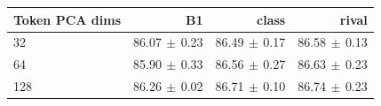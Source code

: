 \begin{tabular}{lrrr}
\toprule
Token PCA dims & B1 & class & rival \\
\midrule
32 & 86.07{\scriptsize$\,\pm\,$0.23} & 86.49{\scriptsize$\,\pm\,$0.17} & 86.58{\scriptsize$\,\pm\,$0.13} \\
64 & 85.90{\scriptsize$\,\pm\,$0.33} & 86.56{\scriptsize$\,\pm\,$0.27} & 86.63{\scriptsize$\,\pm\,$0.23} \\
128 & 86.26{\scriptsize$\,\pm\,$0.02} & 86.71{\scriptsize$\,\pm\,$0.10} & 86.74{\scriptsize$\,\pm\,$0.23} \\
\bottomrule
\end{tabular}
